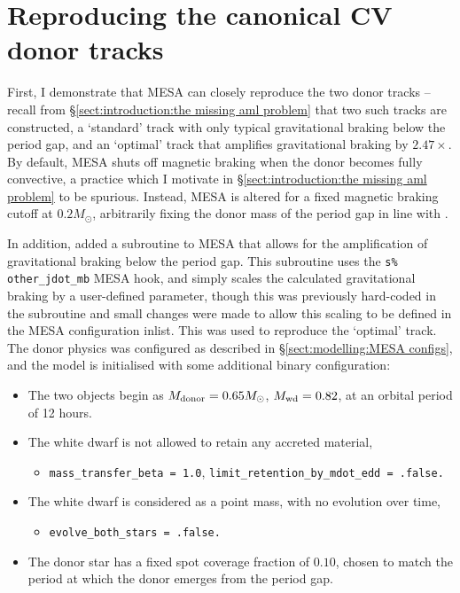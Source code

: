 \label{chpt:results:evolutionary modelling} %

\section{Reproducing the canonical CV donor tracks}
\label{sect:results:reproducing K11 tracks}

First, I demonstrate that MESA can closely reproduce the two \citet{knigge11} donor tracks -- recall from \S\ref{sect:introduction:the missing aml problem} that two such tracks are constructed, a `standard' track with only typical gravitational braking below the period gap, and an `optimal' track that amplifies gravitational braking by $2.47\times$.
By default, MESA shuts off magnetic braking when the donor becomes fully convective, a practice which I motivate in \S\ref{sect:introduction:the missing aml problem} to be spurious. Instead, MESA is altered for a fixed magnetic braking cutoff at $0.2 M_\odot$, arbitrarily fixing the donor mass of the period gap in line with \citet{knigge11}.

In addition, \citet{Pala2017a} added a subroutine to MESA that allows for the amplification of gravitational braking below the period gap.
This subroutine uses the \lstinline{s% other_jdot_mb} MESA hook, and simply scales the calculated gravitational braking by a user-defined parameter, though this was previously hard-coded in the subroutine and small changes were made to allow this scaling to be defined in the MESA configuration inlist.
This was used to reproduce the `optimal' track. The donor physics was configured as described in \S\ref{sect:modelling:MESA configs}, and the model is initialised with some additional binary configuration:
\begin{itemize}
    \item The two objects begin as $M_{\rm donor} = 0.65 M_\odot$, $M_{\rm wd} = 0.82$, at an orbital period of 12 hours.
    \item The white dwarf is not allowed to retain any accreted material,
    \begin{itemize}
        \item \lstinline{mass_transfer_beta = 1.0}, \lstinline{limit_retention_by_mdot_edd = .false.}
    \end{itemize}
    \item The white dwarf is considered as a point mass, with no evolution over time,
    \begin{itemize}
        \item \lstinline{evolve_both_stars = .false.}
    \end{itemize}
    \item The donor star has a fixed spot coverage fraction of $0.10$, chosen to match the period at which the donor emerges from the period gap.
\end{itemize}

